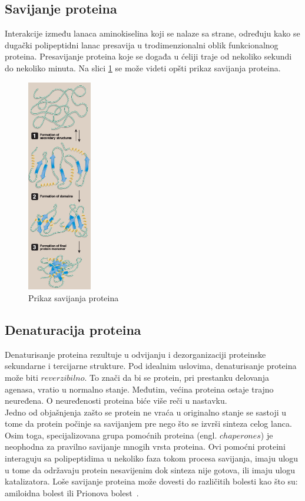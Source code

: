 \subsection{Savijanje proteina}
Interakcije između lanaca aminokiselina koji se nalaze sa strane, određuju kako se dugački polipeptidni lanac presavija u trodimenzionalni oblik funkcionalnog proteina. Presavijanje proteina koje se događa u ćeliji traje od nekoliko sekundi do nekoliko minuta. 
Na slici \ref{fig:folding} se može videti opšti prikaz savijanja proteina.
\begin{figure}[h]
	\centering
    \includegraphics[width=0.25\textwidth]{Figures/BO/protein_folding.png}
    \caption{Prikaz savijanja proteina~\cite{lippincott}}
    \label{fig:folding}
\end{figure}

\subsection{Denaturacija proteina}
Denaturisanje proteina rezultuje u odvijanju i dezorganizaciji proteinske sekundarne i tercijarne strukture. Pod idealnim uslovima, denaturisanje proteina može biti $reverzibilno$. To znači da bi se protein, pri prestanku delovanja agenasa, vratio u normalno stanje. Međutim, većina proteina ostaje trajno neuređena. O neuređenosti proteina biće više reči u nastavku.\\
Jedno od objašnjenja zašto se protein ne vraća u originalno stanje se sastoji u tome da protein počinje sa savijanjem pre nego što se izvrši sinteza celog lanca. Osim toga, specijalizovana grupa pomoćnih proteina (engl. $chaperones$) je neophodna za pravilno savijanje mnogih vrsta proteina. Ovi pomoćni proteini interaguju sa polipeptidima u nekoliko faza tokom procesa savijanja, imaju ulogu u tome da održavaju protein nesavijenim dok sinteza nije gotova, ili imaju ulogu katalizatora. Loše savijanje proteina može dovesti do različitih bolesti kao što su: amiloidna bolest ili Prionova bolest~\cite{lippincott}.

